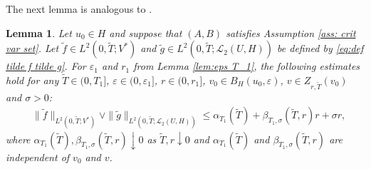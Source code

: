 \documentclass{amsart}
\newcommand{\UH}{\mathcal{L}_2(U,H)}
\newcommand{\<}{\langle}
\newcommand{\?}{\rangle}
\theoremstyle{plain}
\theoremstyle{remark}
\theoremstyle{plain}
\newtheorem{lemma}[theorem]{Lemma}
\numberwithin{equation}{section}
\newcommand{\eps}{\varepsilon}
\begin{document}
The next lemma is analogous to \cite[Lem. 18.2.10]{HNVWvolume3}.

\begin{lemma}\label{lem:tilde f tilde g}
Let $u_0\in H$ and suppose that $(A,B)$ satisfies Assumption \ref{ass: crit var set}.
Let $\tilde{f}\in L^2(0,\tilde{T};V^*)$ and $\tilde{g}\in L^2(0,\tilde{T};\UH)$ be defined by \eqref{eq:def tilde f tilde g}.
For $\eps_1$ and $r_1$ from Lemma \ref{lem:eps T_1},  the following estimates hold for any  $\tilde{T}\in(0,T_1]$, $\eps\in(0,\eps_1]$, $r\in(0,r_1]$, $v_0\in B_H(u_0,\eps)$, $v\in Z_{r,\tilde{T}}(v_0)$  and $\sigma>0$:
\begin{align}
&\| \tilde{f}\|_{L^2(0,\tilde{T};V^*)}\vee \|\tilde{g}\|_{L^2(0,\tilde{T};\UH)}\leq \alpha_{T_1}(\tilde{T})+\beta_{T_1,\sigma}(\tilde{T},r)r+\sigma r, 
\label{eq: estimate tilde f sigma}
\end{align}
  where $\alpha_{T_1}(\tilde{T}),\beta_{T_1,\sigma}(\tilde{T},r)\downarrow 0$ as $\tilde{T},r\downarrow0$ and $\alpha_{T_1}(\tilde{T})$ and $\beta_{T_1,\sigma}(\tilde{T},r)$ are independent of $v_0$ and $v$.
\end{lemma}
\end{document}
